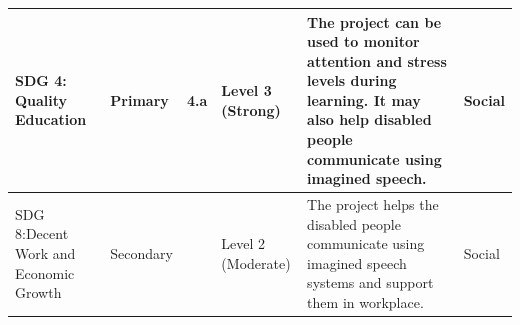 \begin{appendices}
\begin{table}[h]
{\begin{tabular}{|p{3cm}|p{2cm}|p{1.5cm}|p{2.5cm}|p{6cm}|p{2.5cm}|}
SDG 4: Quality Education 
& \centering Primary 
& \centering 4.a 
& \centering Level 3 (Strong) 
&The project can be used to monitor attention and stress levels during learning. It may also help disabled people communicate using imagined speech. 

& \centering Social \tabularnewline
\hline







SDG 8:Decent Work and Economic Growth 
& \centering Secondary 
& \centering 8.5 
& \centering Level 2 (Moderate) 
& The project helps the disabled people communicate using imagined speech systems and support them in workplace. 
& \centering Social \tabularnewline
\hline



\end{tabular}
}
\end{table}


\end{appendices}
